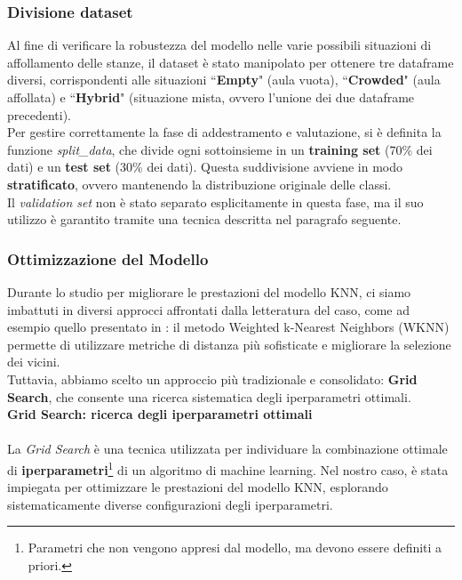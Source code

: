 \documentclass{article}
\begin{document}
\subsubsection{Divisione dataset}
Al fine di verificare la robustezza del modello nelle varie possibili situazioni di affollamento delle stanze, il dataset è stato manipolato per ottenere tre dataframe diversi, corrispondenti alle situazioni “\textbf{Empty}" (aula vuota), “\textbf{Crowded}" (aula affollata) e “\textbf{Hybrid}" (situazione mista, ovvero l'unione dei due dataframe precedenti).\\
Per gestire correttamente la fase di addestramento e valutazione, si è definita la funzione \textit{split\_data}, che divide ogni sottoinsieme in un \textbf{training set} (70\% dei dati) e un \textbf{test set} (30\% dei dati). Questa suddivisione avviene in modo \textbf{stratificato}, ovvero mantenendo la distribuzione originale delle classi.\\
Il \textit{validation set} non è stato separato esplicitamente in questa fase, ma il suo utilizzo è garantito tramite una tecnica descritta nel paragrafo seguente.


\subsubsection{Ottimizzazione del Modello}
Durante lo studio per migliorare le prestazioni del modello KNN, ci siamo imbattuti in diversi approcci affrontati dalla letteratura del caso, come ad esempio quello presentato in \cite{electro}: il metodo Weighted k-Nearest Neighbors (WKNN) permette di utilizzare metriche di distanza più sofisticate e migliorare la selezione dei vicini. \\
Tuttavia, abbiamo scelto un approccio più tradizionale e consolidato: \textbf{Grid Search}, che consente una ricerca sistematica degli iperparametri ottimali.\\

\textbf{Grid Search: ricerca degli iperparametri ottimali}\\\\
La \textit{Grid Search} è una tecnica utilizzata per individuare la combinazione ottimale di \textbf{iperparametri}\footnote{Parametri che non vengono appresi dal modello, ma devono essere definiti a priori.} di un algoritmo di machine learning.  
Nel nostro caso, è stata impiegata per ottimizzare le prestazioni del modello KNN, esplorando sistematicamente diverse configurazioni degli iperparametri.
\end{document}
